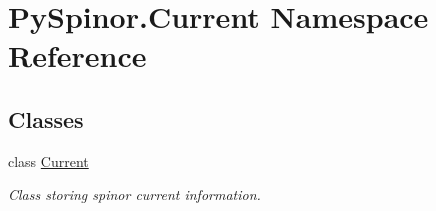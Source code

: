 \hypertarget{namespace_py_spinor_1_1_current}{}\section{Py\+Spinor.\+Current Namespace Reference}
\label{namespace_py_spinor_1_1_current}
\subsection*{Classes}
\begin{DoxyCompactItemize}
\item 
class \hyperlink{class_py_spinor_1_1_current_1_1_current}{Current}
\begin{DoxyCompactList}\small\item\em Class storing spinor current information. \end{DoxyCompactList}\end{DoxyCompactItemize}
